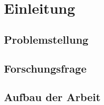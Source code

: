 \chapter{Einleitung}\label{chap:einleitung}

\section{Problemstellung}\label{sec:problem}

\section{Forschungsfrage}\label{sec:forschungsfrage}

\section{Aufbau der Arbeit}\label{sec:aufbau}
